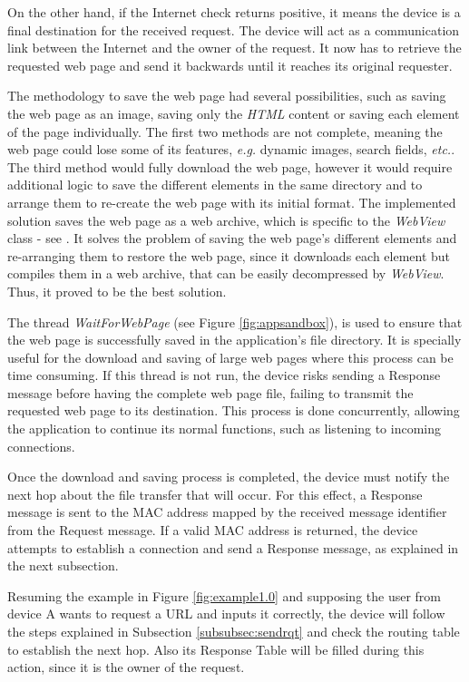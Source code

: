 On the other hand, if the Internet check returns positive, it means the device is a final destination for the received request. The device will act as a communication link between the Internet and the owner of the request. It now has to retrieve the requested web page and send it backwards until it reaches its original requester.

The methodology to save the web page had several possibilities, such as saving the web page as an image, saving only the \textit{HTML} content or saving each element of the page individually. The first two methods are not complete, meaning the web page could lose some of its features, \textit{e.g.} dynamic images, search fields, \textit{etc.}. The third method would fully download the web page, however it would require additional logic to save the different elements in the same directory and to arrange them to re-create the web page with its initial format. The implemented solution saves the web page as a web archive, which is specific to the \textit{WebView} class - see \cite{webview}. It solves the problem of saving the web page's different elements and re-arranging them to restore the web page, since it downloads each element but compiles them in a web archive, that can be easily decompressed by \textit{WebView}. Thus, it proved to be the best solution.

The thread \textit{WaitForWebPage} (see Figure \ref{fig:appsandbox}), is used to ensure that the web page is successfully saved in the application's file directory. It is specially useful for the download and saving of large web pages where this process can be time consuming. If this thread is not run, the device risks sending a Response message before having the complete web page file, failing to transmit the requested web page to its destination. This process is done concurrently, allowing the application to continue its normal functions, such as listening to incoming connections.

Once the download and saving process is completed, the device must notify the next hop about the file transfer that will occur. For this effect, a Response message is sent to the \gls{MAC} address mapped by the received message identifier from the Request message. If a valid \gls{MAC} address is returned, the device attempts to establish a connection and send a Response message, as explained in the next subsection.

Resuming the example in Figure \ref{fig:example1.0} and supposing the user from device A wants to request a \gls{URL} and inputs it correctly, the device will follow the steps explained in Subsection \ref{subsubsec:sendrqt} and check the routing table to establish the next hop. Also its Response Table will be filled during this action, since it is the owner of the request.

